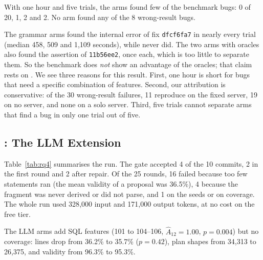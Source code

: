 \begin{observation}
\label{obs:rq3}
With one hour and five trials, the arms found few of the benchmark bugs:
 0 of 20,  1,  2 and 
2. No arm found any of the 8 wrong-result bugs.
\end{observation}

The grammar arms found the internal error of fix \texttt{dfcf6fa7} in nearly
every trial (median 458, 509 and 1{,}109 seconds), while  never did.
The two arms with oracles also found the assertion of \texttt{11b56ee2}, once
each, which is too little to separate them. So the benchmark does \emph{not}
show an advantage of the oracles; that claim rests on . We see three
reasons for this result. First, one hour is short for bugs that need a specific
combination of features. Second, our attribution is conservative: of the 30
wrong-result failures, 11 reproduce on the fixed server, 19 on no server, and
none on a solo server. Third, five trials cannot separate arms that find a bug in
only one trial out of five.

\subsection{: The LLM Extension}
\label{sec:rq4}

\begin{table}[t]
  \centering
  \small
  \caption{: the commit-directed LLM extension on 10 commits. The gate
  accepted 4 commits, most rejected rounds failed on validity, and the run was
  free on the free tier. Diff-coverage gain: changed lines covered with the
  accepted fragments and not without them.}
  \label{tab:rq4}
  
\end{table}

Table~\ref{tab:rq4} summarises the run. The gate accepted 4 of the 10 commits, 2 in the first round and 2 after repair.
Of the 25 rounds, 16 failed because too few statements ran (the mean validity of
a proposal was 36.5\%), 4 because the fragment was never derived or did not
parse, and 1 on the seeds or on coverage. The whole run used 328{,}000 input and
171{,}000 output tokens, at no cost on the free tier.

\begin{observation}
\label{obs:llm}
The LLM arms add SQL features (101 to 104--106, $\hat{A}_{12}=1.00$,
$p=0.004$) but no coverage: lines drop from 36.2\% to 35.7\% ($p=0.42$), plan
shapes from 34{,}313 to 26{,}375, and validity from 96.3\% to 95.3\%.
\end{observation}

